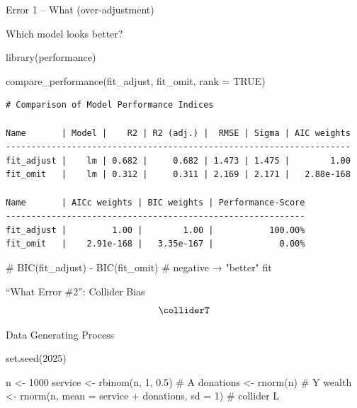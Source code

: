 \documentclass[
  ignorenonframetext,
  aspectratio=169,
]{beamer}
\newenvironment{Shaded}{\begin{snugshade}}{\end{snugshade}}
\newcommand{\AttributeTok}[1]{\textcolor[rgb]{0.40,0.45,0.13}{#1}}
\newcommand{\CommentTok}[1]{\textcolor[rgb]{0.37,0.37,0.37}{#1}}
\newcommand{\ConstantTok}[1]{\textcolor[rgb]{0.56,0.35,0.01}{#1}}
\newcommand{\DecValTok}[1]{\textcolor[rgb]{0.68,0.00,0.00}{#1}}
\newcommand{\FloatTok}[1]{\textcolor[rgb]{0.68,0.00,0.00}{#1}}
\newcommand{\FunctionTok}[1]{\textcolor[rgb]{0.28,0.35,0.67}{#1}}
\newcommand{\NormalTok}[1]{\textcolor[rgb]{0.00,0.23,0.31}{#1}}
\newcommand{\OtherTok}[1]{\textcolor[rgb]{0.00,0.23,0.31}{#1}}
\newcommand{\SpecialCharTok}[1]{\textcolor[rgb]{0.37,0.37,0.37}{#1}}
\begin{document}
\begin{frame}[fragile]{Error 1 -- What (over-adjustment)}
\begin{block}{Which model looks better?}
\label{which-model-looks-better}
\begin{Shaded}
\begin{Highlighting}[]
\FunctionTok{library}\NormalTok{(performance)}

\FunctionTok{compare\_performance}\NormalTok{(fit\_adjust, fit\_omit, }\AttributeTok{rank =} \ConstantTok{TRUE}\NormalTok{)}
\end{Highlighting}
\end{Shaded}

\begin{verbatim}
# Comparison of Model Performance Indices

Name       | Model |    R2 | R2 (adj.) |  RMSE | Sigma | AIC weights
--------------------------------------------------------------------
fit_adjust |    lm | 0.682 |     0.682 | 1.473 | 1.475 |        1.00
fit_omit   |    lm | 0.312 |     0.311 | 2.169 | 2.171 |   2.88e-168

Name       | AICc weights | BIC weights | Performance-Score
-----------------------------------------------------------
fit_adjust |         1.00 |        1.00 |           100.00%
fit_omit   |    2.91e-168 |   3.35e-167 |             0.00%
\end{verbatim}

\begin{Shaded}
\begin{Highlighting}[]
\CommentTok{\# BIC(fit\_adjust) {-} BIC(fit\_omit)  \# negative → "better" fit}
\end{Highlighting}
\end{Shaded}
\end{block}

\begin{block}{``What Error \#2'': Collider Bias}
\label{what-error-2-collider-bias}
\[\colliderT\]
\end{block}

\begin{block}{Data Generating Process}
\label{data-generating-process-1}
\begin{Shaded}
\begin{Highlighting}[]
\FunctionTok{set.seed}\NormalTok{(}\DecValTok{2025}\NormalTok{)}

\NormalTok{n          }\OtherTok{\textless{}{-}} \DecValTok{1000}
\NormalTok{service    }\OtherTok{\textless{}{-}} \FunctionTok{rbinom}\NormalTok{(n, }\DecValTok{1}\NormalTok{, }\FloatTok{0.5}\NormalTok{)                            }\CommentTok{\# A}
\NormalTok{donations  }\OtherTok{\textless{}{-}} \FunctionTok{rnorm}\NormalTok{(n)                                     }\CommentTok{\# Y}
\NormalTok{wealth     }\OtherTok{\textless{}{-}} \FunctionTok{rnorm}\NormalTok{(n, }\AttributeTok{mean =}\NormalTok{ service }\SpecialCharTok{+}\NormalTok{ donations, }\AttributeTok{sd =} \DecValTok{1}\NormalTok{) }\CommentTok{\# collider L}


\end{Highlighting}
\end{Shaded}
\end{block}
\end{frame}
\end{document}
